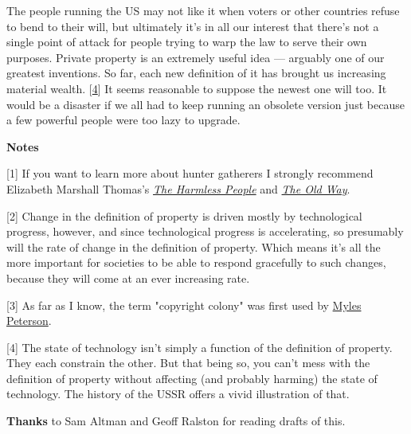 The people running the US may not like it when
                  voters or other countries refuse to bend to their will, but
                  ultimately it's in all our interest that there's not a single
                  point of attack for people trying to warp the law to serve
                  their own purposes. Private property is an extremely useful
                  idea --- arguably one of our greatest inventions. So far,
                  each new definition of it has brought us increasing material
                  wealth.
                  [\href{\#f4n}{4}]
                  It seems reasonable to suppose the newest one will too. It
                  would be a disaster if we all had to keep running an obsolete
                  version just because a few powerful people were too lazy to
                  upgrade.







\textbf{Notes}

[1] If you want to learn more about hunter gatherers I strongly
                  recommend Elizabeth Marshall Thomas's
                  \href{http://www.amazon.com/Harmless-People-Elizabeth-Marshall-Thomas/dp/0394427793}{\emph{The Harmless People}}
                  and
                  \href{http://www.amazon.com/Old-Way-Story-First-People/dp/0374225524}{\emph{The Old Way}}.

[2] Change in the definition of property is driven mostly by
                  technological progress, however, and since technological
                  progress is accelerating, so presumably will the rate of
                  change in the definition of property. Which means it's all the
                  more important for societies to be able to respond gracefully
                  to such changes, because they will come at an ever increasing
                  rate.

[3] As far as I know, the term "copyright colony" was first
                  used by
                  \href{http://torrentfreak.com/australia-us-copyright-colony-or-just-a-good-friend-120121/}{Myles Peterson}.

[4] The state of technology isn't simply a function of the
                  definition of property. They each constrain the other. But
                  that being so, you can't mess with the definition of property
                  without affecting (and probably harming) the state of
                  technology. The history of the USSR offers a vivid
                  illustration of that.

\textbf{Thanks} to Sam Altman
                  and Geoff Ralston for reading drafts of this.


              
            
          
